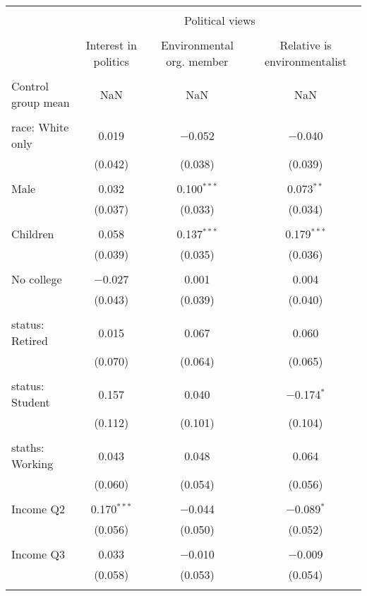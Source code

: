 
\begin{tabular}{@{\extracolsep{5pt}}lccc} 
\\[-1.8ex]\hline 
\hline \\[-1.8ex] 
 & \multicolumn{3}{c}{Political views} \\ 
\cline{2-4} 
\\[-1.8ex] & Interest in politics & Environmental org. member & Relative is environmentalist \\ 
\hline \\[-1.8ex] 
 Control group mean & NaN & NaN & NaN  \\ \hline \\[-1.8ex] race: White only & 0.019 & $-$0.052 & $-$0.040 \\ 
  & (0.042) & (0.038) & (0.039) \\ 
  & & & \\ 
 Male & 0.032 & 0.100$^{***}$ & 0.073$^{**}$ \\ 
  & (0.037) & (0.033) & (0.034) \\ 
  & & & \\ 
 Children & 0.058 & 0.137$^{***}$ & 0.179$^{***}$ \\ 
  & (0.039) & (0.035) & (0.036) \\ 
  & & & \\ 
 No college & $-$0.027 & 0.001 & 0.004 \\ 
  & (0.043) & (0.039) & (0.040) \\ 
  & & & \\ 
 status: Retired & 0.015 & 0.067 & 0.060 \\ 
  & (0.070) & (0.064) & (0.065) \\ 
  & & & \\ 
 status: Student & 0.157 & 0.040 & $-$0.174$^{*}$ \\ 
  & (0.112) & (0.101) & (0.104) \\ 
  & & & \\ 
 staths: Working & 0.043 & 0.048 & 0.064 \\ 
  & (0.060) & (0.054) & (0.056) \\ 
  & & & \\ 
 Income Q2 & 0.170$^{***}$ & $-$0.044 & $-$0.089$^{*}$ \\ 
  & (0.056) & (0.050) & (0.052) \\ 
  & & & \\ 
 Income Q3 & 0.033 & $-$0.010 & $-$0.009 \\ 
  & (0.058) & (0.053) & (0.054) \\ 
  & & & \\ 

\end{tabular}
